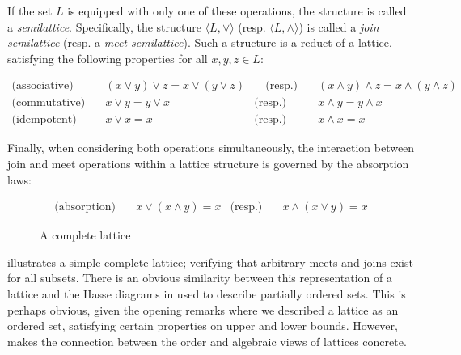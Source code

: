 If the set $L$ is equipped with only one of these operations, the structure is called a \textit{semilattice}. Specifically, the structure $\langle L, \vee \rangle$ (resp. $\langle L, \wedge \rangle$) is called a \textit{join semilattice} (resp. a \textit{meet semilattice}). Such a structure is a reduct of a lattice, satisfying the following properties for all $x, y, z \in L$:

\vspace{-1em}
\begin{align}
  \text{(associative)} & \quad (x \vee y) \vee z = x \vee (y \vee z) & \quad \text{(resp.)} & \quad (x \wedge y) \wedge z = x \wedge (y \wedge z) \\
  \text{(commutative)} & \quad x \vee y = y \vee x & \text{(resp.)}  & \quad x \wedge y = y \wedge x \\
  \text{(idempotent)}  & \quad x \vee x = x & \text{(resp.)}  & \quad x \wedge x = x
\end{align}

Finally, when considering both operations simultaneously, the interaction between join and meet operations within a lattice structure is governed by the absorption laws:

\vspace{-1em}
\begin{align}
  \text{(absorption)} & \quad x \vee (x \wedge y) = x & \text{(resp.)}  & \quad x \wedge (x \vee y) = x
\end{align}

\begin{figure}[H]
  \centering
  \caption{A complete lattice}
  \label{figure:complete-lattice}
\end{figure}

 illustrates a simple complete lattice; verifying that arbitrary meets and joins exist for all subsets. There is an obvious similarity between this representation of a lattice and the Hasse diagrams in  used to describe partially ordered sets. This is perhaps obvious, given the opening remarks where we described a lattice as an ordered set, satisfying certain properties on upper and lower bounds. However,  makes the connection between the order and algebraic views of lattices concrete.

